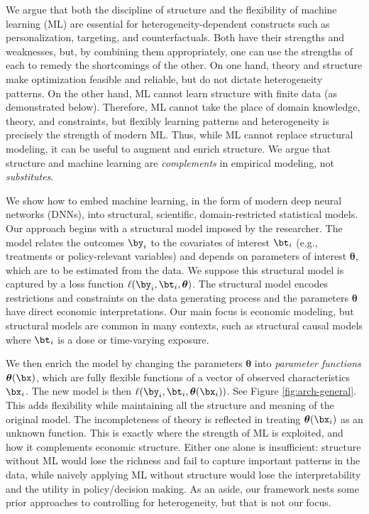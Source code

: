\documentclass[12pt]{article}
\numberwithin{equation}{section}
\theoremstyle{definition}
\newcommand{\btheta}{\boldsymbol{\theta}}
\begin{document}
We argue that both the discipline of structure and the flexibility of machine learning (ML) are essential for heterogeneity-dependent constructs such as personalization, targeting, and counterfactuals. Both have their strengths and weaknesses, but, by combining them appropriately, one can use the strengths of each to remedy the shortcomings of the other. On one hand, theory and structure make optimization feasible and reliable, but do not dictate heterogeneity patterns. On the other hand, ML cannot learn structure with finite data (as demonstrated below). Therefore, ML cannot take the place of domain knowledge, theory, and constraints, but flexibly learning patterns and heterogeneity is precisely the strength of modern ML. Thus, while ML cannot replace structural modeling, it can be useful to augment and enrich structure. We argue that structure and machine learning are \emph{complements} in empirical modeling, not \emph{substitutes}. 

We show how to embed machine learning, in the form of modern deep neural networks (DNNs), into structural, scientific, domain-restricted statistical models. Our approach begins with a structural model imposed by the researcher. The model relates the outcomes $\by_i$ to the covariates of interest $\bt_i$ (e.g., treatments or policy-relevant variables) and depends on parameters of interest $\btheta$, which are to be estimated from the data. We suppose this structural model is captured by a loss function $\ell(\by_i, \bt_i, \btheta)$. The structural model encodes restrictions and constraints on the data generating process and the parameters $\btheta$ have direct economic interpretations. Our main focus is economic modeling, but structural models are common in many contexts, such as structural causal models where $\bt_i$ is a dose or time-varying exposure.

We then enrich the model by changing the parameters $\btheta$ into \emph{parameter functions} $\btheta(\bx)$, which are fully flexible functions of a vector of observed characteristics $\bx_i$. The new model is then $\ell(\by_i, \bt_i, \btheta(\bx_i))$. See Figure \ref{fig:arch-general}.   This adds flexibility while maintaining all the structure and meaning of the original model. The incompleteness of theory is reflected in treating $\btheta(\bx_i)$ as an unknown function. This is exactly where the strength of ML is exploited, and how it complements economic structure. Either one alone is insufficient: structure without ML would lose the richness and fail to capture important patterns in the data, while naively applying ML without structure would lose the interpretability and the utility in policy/decision making. As an aside, our framework nests some prior approaches to controlling for heterogeneity, but that is not our focus.
\end{document}
